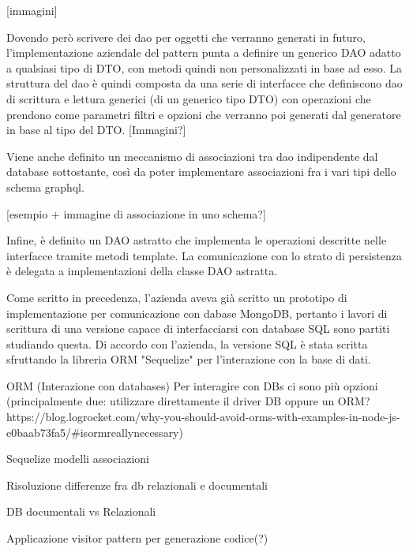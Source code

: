         [immagini]

        Dovendo però scrivere dei dao per oggetti che verranno generati in futuro, l'implementazione aziendale del pattern punta a definire un generico DAO adatto a qualsiasi tipo di DTO, con metodi quindi non personalizzati in base ad esso.
        La struttura del dao è quindi composta da una serie di interfacce che definiscono dao di scrittura e lettura generici (di un generico tipo DTO) con operazioni che prendono come parametri filtri e opzioni che verranno poi generati dal generatore in base al tipo del DTO.
        [Immagini?]
        
        Viene anche definito un meccanismo di associazioni tra dao indipendente dal database sottostante, così da poter implementare associazioni fra i vari tipi dello schema graphql.

        [esempio + immagine di associazione in uno schema?]

        Infine, è definito un DAO astratto che implementa le operazioni descritte nelle interfacce tramite metodi template.
        La comunicazione con lo strato di persistenza è delegata a implementazioni della classe DAO astratta.

        Come scritto in precedenza, l'azienda aveva già scritto un prototipo di implementazione per comunicazione con dabase MongoDB, pertanto i lavori di scrittura di una versione capace di interfacciarsi con database SQL sono partiti studiando questa.
        Di accordo con l'azienda, la versione SQL è stata scritta sfruttando la libreria ORM "Sequelize" per l'interazione con la base di dati.
    
       
    ORM (Interazione con databases)
        Per interagire con DBs ci sono più opzioni (principalmente due: utilizzare direttamente il driver DB oppure un ORM? https://blog.logrocket.com/why-you-should-avoid-orms-with-examples-in-node-js-e0baab73fa5/#isormreallynecessary) 
        
        Sequelize
        modelli
        associazioni
        
    Risoluzione differenze fra db relazionali e documentali
    
    DB documentali vs Relazionali

    Applicazione visitor pattern per generazione codice(?)



